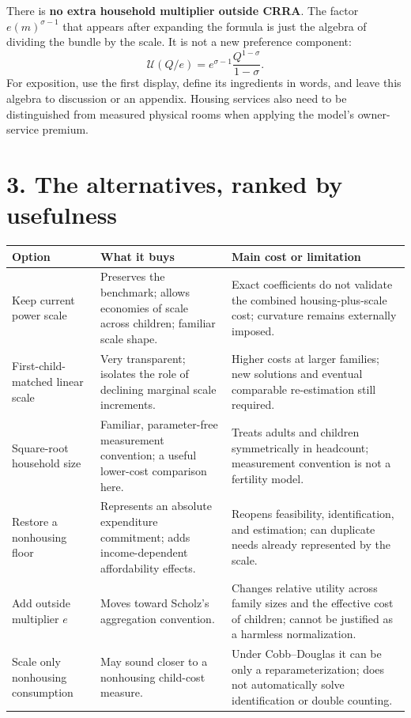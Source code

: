 \documentclass[11pt,letterpaper]{article}
\newcommand{\U}{\mathcal U}
\newcommand{\page}[1]{\newpage\section*{#1}}
\begin{document}
There is \textbf{no extra household multiplier outside CRRA}. The factor $e(m)^{\sigma-1}$ that appears after expanding the formula is just the algebra of dividing the bundle by the scale. It is not a new preference component:
\[
\U(Q/e)=e^{\sigma-1}\frac{Q^{1-\sigma}}{1-\sigma}.
\]
For exposition, use the first display, define its ingredients in words, and leave this algebra to discussion or an appendix. Housing services also need to be distinguished from measured physical rooms when applying the model's owner-service premium.

\page{3. The alternatives, ranked by usefulness}
\small
\renewcommand{\arraystretch}{1.22}
\begin{tabularx}{\textwidth}{@{}>{\raggedright\arraybackslash}p{}>{\raggedright\arraybackslash}X>{\raggedright\arraybackslash}X@{}}
\toprule
Option & What it buys & Main cost or limitation\\
\midrule
Keep current power scale & Preserves the benchmark; allows economies of scale across children; familiar scale shape. & Exact coefficients do not validate the combined housing-plus-scale cost; curvature remains externally imposed.\\
First-child-matched linear scale & Very transparent; isolates the role of declining marginal scale increments. & Higher costs at larger families; new solutions and eventual comparable re-estimation still required.\\
Square-root household size & Familiar, parameter-free measurement convention; a useful lower-cost comparison here. & Treats adults and children symmetrically in headcount; measurement convention is not a fertility model.\\
Restore a nonhousing floor & Represents an absolute expenditure commitment; adds income-dependent affordability effects. & Reopens feasibility, identification, and estimation; can duplicate needs already represented by the scale.\\
Add outside multiplier $e$ & Moves toward Scholz's aggregation convention. & Changes relative utility across family sizes and the effective cost of children; cannot be justified as a harmless normalization.\\
Scale only nonhousing consumption & May sound closer to a nonhousing child-cost measure. & Under Cobb--Douglas it can be only a reparameterization; does not automatically solve identification or double counting.\\
\bottomrule
\end{tabularx}
\normalsize
\end{document}
